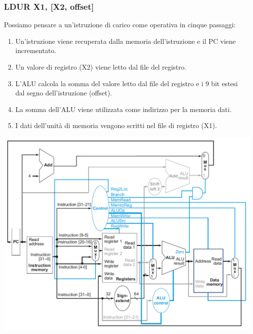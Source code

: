 \documentclass[12pt,a4paper]{article}
\begin{document}
\subsubsection{LDUR X1, [X2, offset]}
Possiamo pensare a un'istruzione di carico come operativa in cinque passaggi:
\begin{enumerate}
\item Un'istruzione viene recuperata dalla memoria dell'istruzione e il PC viene incrementato.
\item Un valore di registro (X2) viene letto dal file del registro.
\item L'ALU calcola la somma del valore letto dal file del registro e i 9 bit estesi dal segno dell'istruzione (offset).
\item La somma dell'ALU viene utilizzata come indirizzo per la memoria dati.
\item I dati dell'unità di memoria vengono scritti nel file di registro (X1).
\end{enumerate}
\begin{center}
\includegraphics[width=0.6\columnwidth]{img/ldur_x1x2.png}
\end{center}
\end{document}
